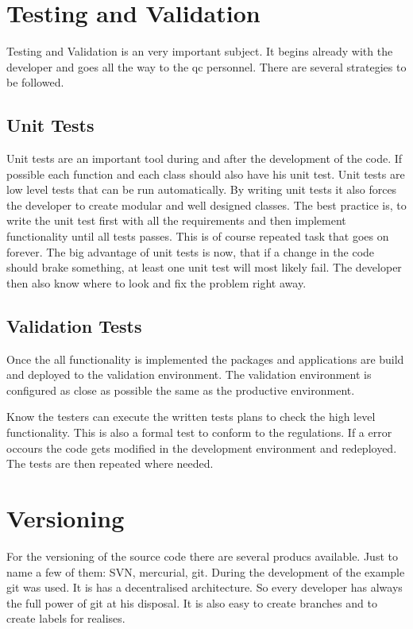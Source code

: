 \documentclass[paper=a4,twoside=false,BCOR=0mm,DIV=calc,fontsize=12pt]{scrartcl}
\begin{document}
\section{Testing and Validation}
Testing and Validation is an very important subject. It begins already with the developer and goes all the way to the qc personnel.
There are several strategies to be followed.

\subsection{Unit Tests}
Unit tests are an important tool during and after the development of the code. If possible each function and each class should also have his unit test. 
Unit tests are low level tests that can be run automatically. By writing unit tests it also forces the developer to create modular and well designed classes.
The best practice is, to write the unit test first with all the requirements and then implement functionality until all tests passes. This is of course repeated task 
that goes on forever.
The big advantage of unit tests is now, that if a change in the code should brake something, at least one unit test will most likely fail.
The developer then also know where to look and fix the problem right away.

\subsection{Validation Tests}
Once the all functionality is implemented the packages and applications are build and deployed to the validation environment. The validation environment is configured as 
close as possible the same as the productive environment.

Know the testers can execute the written tests plans to check the high level functionality. This is also a formal test to conform to the regulations. If a error occours 
the code gets modified in the development environment and redeployed. The tests are then repeated where needed.


\section{Versioning}
For the versioning of the source code there are several producs available. Just to name a few of them: SVN, mercurial, git.
During the development of the example git was used. It is has a decentralised architecture. So every developer has always the full power of git at his disposal. It is also easy to create branches and to create labels for realises.
\end{document}
